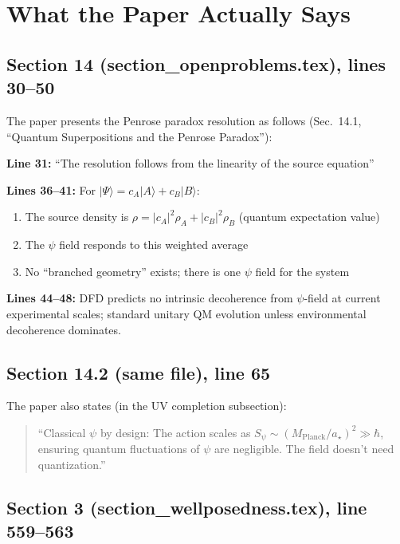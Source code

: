 \documentclass[11pt,a4paper]{article}
\begin{document}
\section{What the Paper Actually Says}

\subsection{Section 14 (section\_openproblems.tex), lines 30--50}

The paper presents the Penrose paradox resolution as follows
(Sec.~14.1, ``Quantum Superpositions and the Penrose Paradox''):

\begin{tcolorbox}[colback=red!5!white, colframe=red!60!black,
  title=Paper's Actual Text (lines 31--48)]
\textbf{Line 31:} ``The resolution follows from the linearity of the
source equation''

\textbf{Lines 36--41:} For $|\Psi\rangle = c_A|A\rangle + c_B|B\rangle$:
\begin{enumerate}
\item The source density is
$\rho = |c_A|^2\rho_A + |c_B|^2\rho_B$ (quantum expectation value)
\item The $\psi$ field responds to this weighted average
\item No ``branched geometry'' exists; there is one $\psi$ field for
the system
\end{enumerate}

\textbf{Lines 44--48:} DFD predicts no intrinsic decoherence from $\psi$-field
at current experimental scales; standard unitary QM evolution unless
environmental decoherence dominates.
\end{tcolorbox}

\subsection{Section 14.2 (same file), line 65}

The paper also states (in the UV completion subsection):
\begin{quote}
``Classical $\psi$ by design: The action scales as
$S_\psi \sim (M_{\mathrm{Planck}}/a_\star)^2 \gg \hbar$,
ensuring quantum fluctuations of $\psi$ are negligible. The field
doesn't need quantization.''
\end{quote}

\subsection{Section 3 (section\_wellposedness.tex), line 559--563}
\end{document}
